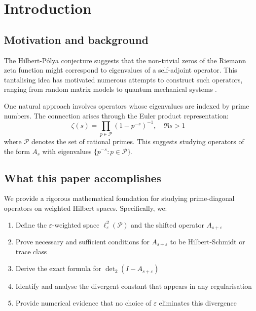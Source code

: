 \documentclass[11pt,a4paper]{article}
\theoremstyle{definition}
\theoremstyle{remark}
\newcommand{\calP}{\mathcal{P}}
\begin{document}
\section{Introduction}\label{sec:intro}

\subsection{Motivation and background}

The Hilbert-Pólya conjecture suggests that the non-trivial zeros of the Riemann 
zeta function might correspond to eigenvalues of a self-adjoint operator. This 
tantalising idea has motivated numerous attempts to construct such operators, 
ranging from random matrix models \cite{BerryKeating1999} to quantum mechanical 
systems \cite{ConnesTrace1997}.

One natural approach involves operators whose eigenvalues are indexed by prime 
numbers. The connection arises through the Euler product representation:
\[
\zeta(s) = \prod_{p \in \calP} (1 - p^{-s})^{-1}, \quad \Re s > 1
\]
where $\calP$ denotes the set of rational primes. This suggests studying operators 
of the form $A_s$ with eigenvalues $\{p^{-s} : p \in \calP\}$.

\subsection{What this paper accomplishes}

We provide a rigorous mathematical foundation for studying prime-diagonal operators 
on weighted Hilbert spaces. Specifically, we:

\begin{enumerate}
\item Define the $\varepsilon$-weighted space $\ell^2_\varepsilon(\calP)$ and the 
      shifted operator $A_{s+\varepsilon}$
\item Prove necessary and sufficient conditions for $A_{s+\varepsilon}$ to be 
      Hilbert-Schmidt or trace class
\item Derive the exact formula for $\det_2(I - A_{s+\varepsilon})$
\item Identify and analyse the divergent constant that appears in any regularisation
\item Provide numerical evidence that no choice of $\varepsilon$ eliminates this divergence
\end{enumerate}
\end{document}
